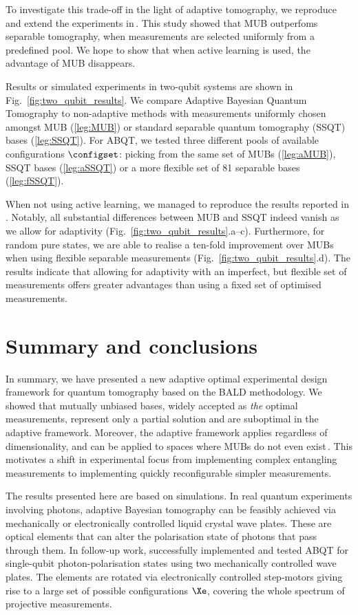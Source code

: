To investigate this trade-off in the light of adaptive tomography, we reproduce and extend the experiments in\,\citep{MUBExperiment}. This study showed that MUB outperfoms separable tomography, when measurements are selected uniformly from a predefined pool. We hope to show that when active learning is used, the advantage of MUB disappears.

Results or simulated experiments in two-qubit systems are shown in Fig.\ \ref{fig:two_qubit_results}. We compare Adaptive Bayesian Quantum Tomography to non-adaptive methods with measurements uniformly chosen amongst MUB (\ref{leg:MUB}) or standard separable quantum tomography (SSQT) bases (\ref{leg:SSQT}). For ABQT, we tested three different pools of available configurations $\configset$: picking from the same set of MUBs (\ref{leg:aMUB}), SSQT bases (\ref{leg:aSSQT}) or a more flexible set of 81 separable bases (\ref{leg:fSSQT}).

When not using active learning, we managed to reproduce the results reported in \citep{MUBExperiment}. Notably, all substantial differences between MUB and SSQT indeed vanish as we allow for adaptivity (Fig.\ \ref{fig:two_qubit_results}.a--c). Furthermore, for random pure states, we are able to realise a ten-fold improvement over MUBs when using flexible separable measurements (Fig.\ \ref{fig:two_qubit_results}.d). The results indicate that allowing for adaptivity with an imperfect, but flexible set of measurements offers greater advantages than using a fixed set of optimised measurements.

\section{Summary and conclusions}

In summary, we have presented a new adaptive optimal experimental design framework for quantum tomography based on the BALD methodology. We showed that mutually unbiased bases, widely accepted as \emph{the} optimal measurements, represent only a partial solution and are suboptimal in the adaptive framework. Moreover, the adaptive framework applies regardless of dimensionality, and can be applied to spaces where MUBs do not even exist\,\citep{DimensionSix,ExactInformation}. This motivates a shift in experimental focus from implementing complex entangling measurements to implementing quickly reconfigurable simpler measurements.
	
The results presented here are based on simulations. In real quantum experiments involving photons, adaptive Bayesian tomography can be feasibly achieved via mechanically or electronically controlled liquid crystal wave plates. These are optical elements that can alter the polarisation state of photons that pass through them. In follow-up work, \citet{Kravtsov2013} successfully implemented and tested ABQT for single-qubit photon-polarisation states using two mechanically controlled wave plates. The elements are rotated via electronically controlled step-motors giving rise to a large set of possible configurations $\Xe$, covering the whole spectrum of projective measurements.


